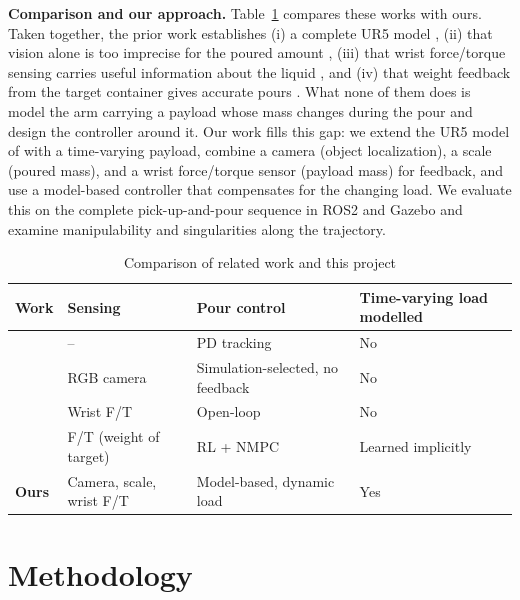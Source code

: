 \documentclass[conference]{IEEEtran}
\begin{document}
\textbf{Comparison and our approach.}
Table~\ref{tab:compare} compares these works with ours. Taken together, the prior work establishes (i) a 
complete UR5 model \cite{kebria2016}, (ii) that vision alone is too imprecise for the poured amount 
\cite{schober2024}, (iii) that wrist force/torque sensing carries useful information about the liquid 
\cite{luo2024}, and (iv) that weight feedback from the target container gives accurate pours 
\cite{babaians2022}. What none of them does is model the arm carrying a payload whose mass changes during 
the pour and design the controller around it. Our work fills this gap: we extend the UR5 model of 
\cite{kebria2016} with a time-varying payload, combine a camera (object localization), a scale (poured 
mass), and a wrist force/torque sensor (payload mass) for feedback, and use a model-based controller that 
compensates for the changing load. We evaluate this on the complete pick-up-and-pour sequence in ROS2 and 
Gazebo and examine manipulability and singularities along the trajectory.

\begin{table}[t]
    \caption{Comparison of related work and this project}
    \label{tab:compare}
    \centering
    \small
    \begin{tabular}{@{}p{1.5cm}p{1.9cm}p{1.9cm}p{1.9cm}@{}}
        \toprule
        Work                & Sensing                  & Pour control                     & Time-varying load modelled \\
        \midrule
        \cite{kebria2016}   & --                       & PD tracking                      & No                         \\
        \cite{schober2024}  & RGB camera               & Simulation-selected, no feedback & No                         \\
        \cite{luo2024}      & Wrist F/T                & Open-loop                        & No                         \\
        \cite{babaians2022} & F/T (weight of target)   & RL + NMPC                        & Learned implicitly         \\
        \textbf{Ours}       & Camera, scale, wrist F/T & Model-based, dynamic load        & Yes                        \\
        \bottomrule
    \end{tabular}
\end{table}

\section{Methodology}
\label{sec:method}
\end{document}
